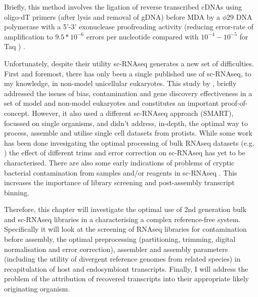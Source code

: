 Briefly, this method involves the ligation of reverse transcribed cDNAs using oligo-dT primers (after lysis and 
removal of gDNA) before MDA by a \(\phi29\) DNA polymerase with a 5'-3' exonuclease proofreading activity 
(reducing error-rate of amplification to \(9.5*10^{-6}\) errors per nucleotide \citep{Paez2004} compared with
\(10^{-4}-10^{-5}\) for Taq \citep{Tindall1988,Eckert1990}) \citep{Korfhage2015}.



Unfortunately, despite their utility sc-RNAseq generates a new set of difficulties.
First and foremost, there has only been a single published use of sc-RNAseq, to my knowledge, in non-model unicellular eukaryotes.   
This study by \citep{Kolisko2014}, briefly addressed the issues of bias, contamination and gene discovery effectiveness in a set of model and non-model eukaryotes and
constitutes an important proof-of-concept.  However, it also used a different sc-RNAseq approach (SMART), focussed on single organisms, 
and didn't address, in-depth, the optimal way to process, assemble and utilise single cell datasets from protists.
While some work has been done invesigating the optimal processing of bulk RNAseq datasets (e.g. \citep{Macmanes2013,Macmanes2015}) the effect of
different trims and error correction on sc-RNAseq has yet to be characterised.  
There are also some early indications of problems of cryptic bacterial contamination
from samples and/or reagents in sc-RNAseq \citep{Kolisko2014}. This increases the importance
of library screening and post-assembly transcript binning.


Therefore, this chapter will investigate the optimal use of 2nd generation bulk and sc-RNAseq libraries
in a characterising a complex reference-free system.  Specifically it will look at the screening of RNAseq libraries for contamination
before assembly, the optimal preprocessing (partitioning, trimming, digital normalisation and error correction), assembler and assembly
parameters (including the utility of divergent reference genomes from related species) in recapitulation of host and endosymbiont transcripts.
Finally, I will address the problem of the attribution of recovered transcripts into their appropriate likely originating organism.  



